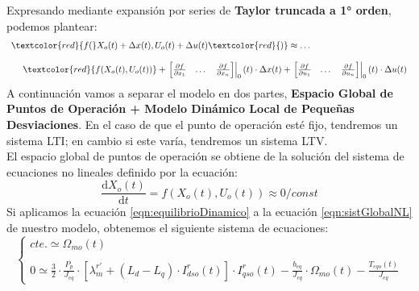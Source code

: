 \documentclass[10pt]{article}
\begin{document}
\begin{enumerate}
	Expresando mediante expansión por series de \textbf{Taylor truncada a 1° orden}, podemos plantear:
	\begin{equation}
		\begin{array}{l}
			\textcolor{red}{f(} X_{o}(t)+\Delta x(t),U_{o}(t)+\Delta u(t) \textcolor{red}{)} \approx \dots
			\\
			\\
			\ \ \ \ 
			\textcolor{red}{f( X_{o}(t),U_{o}(t) )}+
			\left.\begin{matrix}
				\begin{bmatrix}
					\frac{\partial f}{\partial x_{1}} & \dots & \frac{\partial f}{\partial x_{n}}
				\end{bmatrix}
			\end{matrix}\right|_{0}(t)\cdot \Delta x(t)+
			\left.\begin{matrix}
				\begin{bmatrix}
					\frac{\partial f}{\partial u_{1}} & \dots & \frac{\partial f}{\partial u_{n}}
				\end{bmatrix}
			\end{matrix}\right|_{0}(t)\cdot \Delta u(t)
		\end{array}
	\end{equation}
	A continuación vamos a separar el modelo en dos partes, \textbf{Espacio Global de Puntos de Operación + Modelo Dinámico Local de Pequeñas Desviaciones}.
	En el caso de que el punto de operación esté fijo, tendremos un sistema LTI; en cambio si este varía, tendremos un sistema LTV.
	\\
	El espacio global de puntos de operación se obtiene de la solución del sistema de ecuaciones no lineales definido por la ecuación:
	\begin{equation}
		\label{eqn:equilibrioDinamico}
		\frac{\mathrm{d} X_{o}(t)}{\mathrm{d} t}=f(X_{o}(t),U_{o}(t))\approx 0/const
	\end{equation}
	Si aplicamos la ecuación \ref{eqn:equilibrioDinamico} a la ecuación \ref{eqn:sistGlobalNL} de nuestro modelo, obtenemos el siguiente sistema de ecuaciones:
	\begin{equation}
		\label{eqn:equilibrioDinamicoSistema}
		\begin{cases}
			cte.\simeq \Omega_{mo}(t)
			\\
			\\
			0\simeq \frac{3}{2} \cdot \frac{ P_{p}}{J_{eq}}\cdot \left [ \lambda_{m}^{r'}+\left ( L_{d}-L_{q} \right )\cdot I_{dso}^{r} \left ( t \right ) \right ] \cdot I_{qso}^{r}\left ( t \right )-\frac{b_{eq}}{J_{eq}}\cdot \Omega_{mo}\left ( t \right )-\frac{T_{eqo}(t)}{J_{eq}}

\end{cases}
\end{equation}
\end{enumerate}
\end{document}
